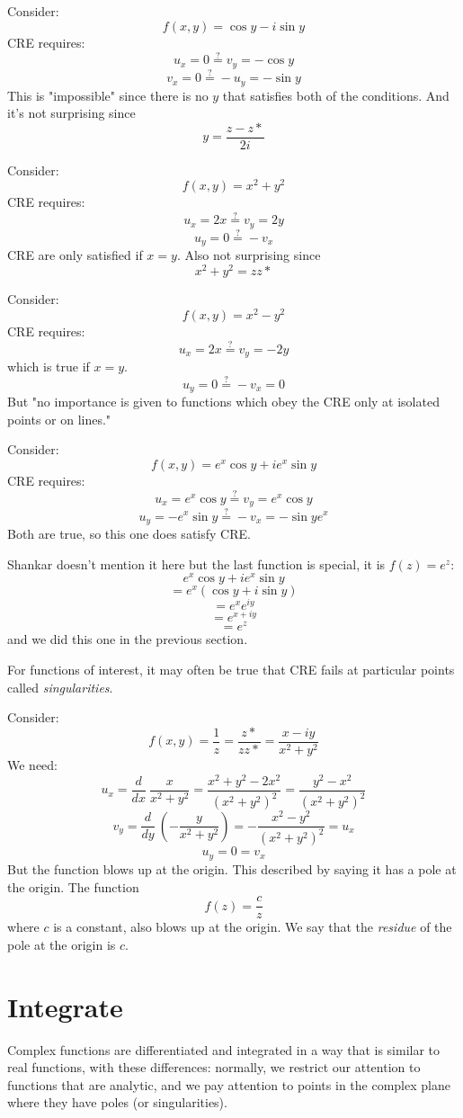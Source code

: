 \documentclass[11pt, oneside]{article}   	%
\begin{document}
Consider:
\[ f(x,y) = \cos y - i \sin y \]
CRE requires:
\[ u_x = 0 \stackrel{?}{=} v_y = - \cos y \]
\[ v_x = 0 \stackrel{?}{=}  -u_y = - \sin y \]
This is "impossible" since there is no $y$ that satisfies both of the conditions.  And it's not surprising since
\[ y = \frac{z - z*}{2i} \]

Consider:
\[ f(x,y) = x^2 + y^2 \]
CRE requires:
\[ u_x = 2x \stackrel{?}{=}  v_y = 2y \]
\[ u_y = 0 \stackrel{?}{=}  -v_x \]
CRE are only satisfied if $x=y$.  Also not surprising since
\[ x^2 + y^2 = zz* \]

Consider:
\[ f(x,y) = x^2 - y^2 \]
CRE requires:
\[ u_x = 2x \stackrel{?}{=} v_y = -2y \]
which is true if $x = y$.
\[ u_y = 0 \stackrel{?}{=} -v_x = 0 \]
But "no importance is given to functions which obey the CRE only at isolated points or on lines."

Consider:
\[ f(x,y) = e^x \cos y + i e^x \sin y \]
CRE requires:
\[ u_x = e^x \cos y \stackrel{?}{=} v_y = e^x \cos y \]
\[ u_y = -e^x \sin y \stackrel{?}{=} -v_x = - \sin y e^x \]
Both are true, so this one does satisfy CRE.

Shankar doesn't mention it here but the last function is special, it is $f(z) = e^z$:
\[ e^x \cos y + i e^x \sin y \]
\[ = e^x (\cos y + i \sin y) \]
\[ = e^x e^{iy} \]
\[ = e^{x + iy} \]
\[ = e^z \]
and we did this one in the previous section.

For functions of interest, it may often be true that CRE fails at particular points called \emph{singularities}.

Consider:
\[ f(x,y) = \frac{1}{z} = \frac{z*}{zz*} = \frac{x-iy}{x^2 + y^2} \]
We need:
\[ u_x = \frac{d}{dx} \ \frac{x}{x^2 + y^2} = \frac{x^2 + y^2 - 2x^2}{(x^2 + y^2)^2}  = \frac{y^2 - x^2}{(x^2 + y^2)^2} \]
\[ v_y = \frac{d}{dy} \ (-\frac{y}{x^2 + y^2} ) = - \frac{x^2 - y^2}{(x^2 + y^2)^2} = u_x \]
\[ u_y =  0 = v_x \]
But the function blows up at the origin.  This described by saying it has a pole at the origin.
The function
\[ f(z) = \frac{c}{z} \]
where $c$ is a constant, also blows up at the origin.  We say that the \emph{residue} of the pole at the origin is $c$.

\section{Integrate}
Complex functions are differentiated and integrated in a way that is similar to real functions, with these differences:  normally, we restrict our attention to functions that are analytic, and we pay attention to points in the complex plane where they have poles (or singularities).  
\end{document}
